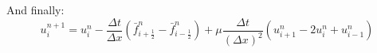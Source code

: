 \documentclass[11pt, a4paper]{article}
\begin{document}
And finally:
\begin{equation}
    u_i^{n+1}=u_i^n-\frac{\Delta t}{\Delta x}\left(\bar{f}_{i+\frac{1}{2}}^n-\bar{f}_{i-\frac{1}{2}}^n\right)+\mu\frac{\Delta t}{\left(\Delta x\right)^2}\left(u_{i+1}^n-2u_i^n+u_{i-1}^n\right)
\end{equation}


\end{document}

